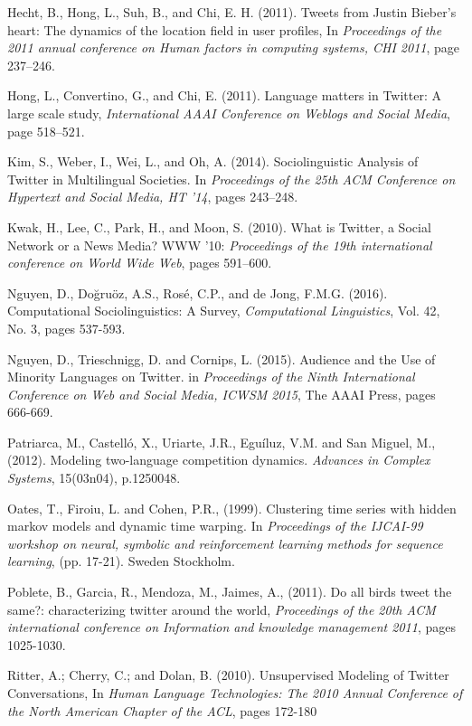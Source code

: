 \documentclass[12pt]{article}
\begin{document}
\begin{thebibliography}{9}
Hecht, B., Hong, L., Suh, B., and Chi, E. H. (2011).
Tweets from Justin Bieber's heart: The dynamics of the location field in user profiles, In \textit{Proceedings of the 2011 annual conference on Human factors in computing systems, CHI 2011}, page 237–246.


Hong, L., Convertino, G., and Chi, E. (2011).
Language matters in Twitter: A large scale study, \textit{International AAAI Conference on Weblogs and Social Media}, page 518–521.

Kim, S., Weber, I., Wei, L., and Oh, A. (2014). Sociolinguistic Analysis of Twitter in Multilingual Societies. In \textit{Proceedings of the 25th ACM Conference on Hypertext and Social Media, HT '14}, pages 243–248.

Kwak, H., Lee, C., Park, H., and Moon, S. (2010). What is Twitter, a Social Network or a News Media? WWW '10: \textit{Proceedings of the 19th international conference on World Wide Web}, pages 591–600.

Nguyen, D., Doğruöz, A.S., Rosé, C.P., and de Jong, F.M.G. (2016).
Computational Sociolinguistics: A Survey, \textit{Computational Linguistics}, Vol. 42, No. 3, pages 537-593.

Nguyen, D., Trieschnigg, D. and Cornips, L. (2015). Audience and the Use of Minority Languages on Twitter. in \textit{Proceedings of the Ninth International Conference on Web and Social Media, ICWSM 2015}, The AAAI Press, pages 666-669.

Patriarca, M., Castell\'o, X., Uriarte, J.R., Egu\'iluz, V.M. and San Miguel, M., (2012). Modeling two-language competition dynamics. \textit{Advances in Complex Systems}, 15(03n04), p.1250048.

Oates, T., Firoiu, L. and Cohen, P.R., (1999). Clustering time series with hidden markov models and dynamic time warping. In \textit{Proceedings of the IJCAI-99 workshop on neural, symbolic and reinforcement learning methods for sequence learning}, (pp. 17-21). Sweden Stockholm.

Poblete, B., Garcia, R., Mendoza, M., Jaimes, A., (2011). Do all birds tweet the same?: characterizing twitter around the world, \textit{Proceedings of the 20th ACM international conference on Information and knowledge management 2011}, pages 1025-1030.

Ritter, A.; Cherry, C.; and Dolan, B. (2010). Unsupervised Modeling
of Twitter Conversations, In \textit{Human Language Technologies: The 2010 Annual Conference of the North American Chapter of the ACL}, pages 172-180



\end{thebibliography}
\end{document}
